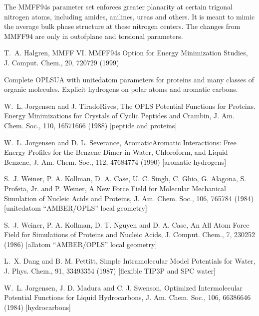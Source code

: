 \documentclass[letterpaper,11pt,english]{sphinxmanual}
\begin{document}
\sphinxAtStartPar
{}

\sphinxAtStartPar
The MMFF94s parameter set enforces greater planarity at certain trigonal nitrogen atoms, including amides, anilines, ureas and others. It is meant to mimic the average bulk phase structure at these nitrogen centers. The changes from MMFF94 are only in out\sphinxhyphen{}of\sphinxhyphen{}plane and torsional parameters.

\sphinxAtStartPar
T. A. Halgren, MMFF VI. MMFF94s Option for Energy Minimization Studies, J. Comput. Chem., 20, 720\sphinxhyphen{}729 (1999)

\sphinxAtStartPar
{}

\sphinxAtStartPar
Complete OPLS\sphinxhyphen{}UA with united\sphinxhyphen{}atom parameters for proteins and many classes of organic molecules. Explicit hydrogens on polar atoms and aromatic carbons.

\sphinxAtStartPar
W. L. Jorgensen and J. Tirado\sphinxhyphen{}Rives, The OPLS Potential Functions for Proteins. Energy Minimizations for Crystals of Cyclic Peptides and Crambin, J. Am. Chem. Soc., 110, 1657\sphinxhyphen{}1666 (1988)  {[}peptide and proteins{]}

\sphinxAtStartPar
W. L. Jorgensen and D. L. Severance, Aromatic\sphinxhyphen{}Aromatic Interactions: Free Energy Profiles for the Benzene Dimer in Water, Chloroform, and Liquid Benzene, J. Am. Chem. Soc., 112, 4768\sphinxhyphen{}4774 (1990)  {[}aromatic hydrogens{]}

\sphinxAtStartPar
S. J. Weiner, P. A. Kollman, D. A. Case, U. C. Singh, C. Ghio, G. Alagona, S. Profeta, Jr. and P. Weiner, A New Force Field for Molecular Mechanical Simulation of Nucleic Acids and Proteins, J. Am. Chem. Soc., 106, 765\sphinxhyphen{}784 (1984)  {[}united\sphinxhyphen{}atom “AMBER/OPLS” local geometry{]}

\sphinxAtStartPar
S. J. Weiner, P. A. Kollman, D. T. Nguyen and D. A. Case, An All Atom Force Field for Simulations of Proteins and Nucleic Acids, J. Comput. Chem., 7, 230\sphinxhyphen{}252 (1986)  {[}all\sphinxhyphen{}atom “AMBER/OPLS” local geometry{]}

\sphinxAtStartPar
L. X. Dang and B. M. Pettitt, Simple Intramolecular Model Potentials for Water, J. Phys. Chem., 91, 3349\sphinxhyphen{}3354 (1987)  {[}flexible TIP3P and SPC water{]}

\sphinxAtStartPar
W. L. Jorgensen, J. D. Madura and C. J. Swenson, Optimized Intermolecular Potential Functions for Liquid Hydrocarbons, J. Am. Chem. Soc., 106, 6638\sphinxhyphen{}6646 (1984)  {[}hydrocarbons{]}
\end{document}
